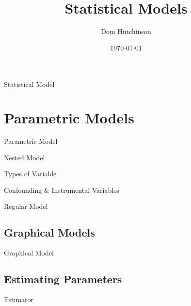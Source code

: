 \documentclass[11pt,a4paper]{article}
\begin{document}
\title{Statistical Models}
\author{Dom Hutchinson}
\date{\today}
\maketitle

\begin{definition}{Statistical Model}

\end{definition}

\section{Parametric Models}

\begin{definition}{Parametric Model}

\end{definition}

\begin{definition}{Nested Model}

\end{definition}

\begin{definition}{Types of Variable}
\end{definition}

\begin{definition}{Confounding & Instrumental Variables}

\end{definition}

\begin{definition}{Regular Model}

\end{definition}

\subsection{Graphical Models}

\begin{definition}{Graphical Model}
\end{definition}

\subsection{Estimating Parameters}

\begin{definition}{Estimator}

\end{definition}
\end{document}
